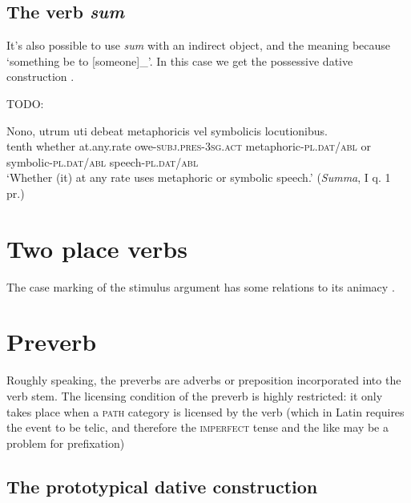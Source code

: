 \documentclass[a4paper, oneside, 12pt]{report}
\newcommand*{\citesec}[1]{\S~{#1}}
\newcommand{\form}[1]{\emph{#1}}
\newcommand*{\category}[1]{\textsc{#1}}
\newcommand{\translate}[1]{`#1'}
\newcommand{\literature}[1]{\textit{#1}}
\begin{document}
\subsection{The verb \form{sum}}\label{sec:sum}

It's also possible to use \form{sum} with an indirect object, 
and the meaning because \translate{something be to [someone]_{}}.
In this case we get the possessive dative construction
\citep[\citesec{373}]{allen1903allen}.

TODO: 

\begin{exe}
    \ex \gll Nono, utrum uti debeat metaphoricis vel symbolicis locutionibus. \\
    tenth whether at.any.rate owe-\category{subj}.\category{pres}-\category{3sg}.\category{act}  
    metaphoric-\category{pl.dat/abl} or symbolic-\category{pl.dat/abl} 
    speech-\category{pl.dat/abl} \\
    \glt \translate{Whether (it) at any rate uses metaphoric or symbolic speech.} (\literature{Summa}, I q. 1 pr.)
\end{exe}

\section{Two place verbs}

The case marking of the stimulus argument has some relations to its animacy
\citep[\citesec{4.34}]{Pinkster1}.

\section{Preverb}

Roughly speaking, the preverbs are adverbs or preposition incorporated into the verb stem.
The licensing condition of the preverb is highly restricted:
it only takes place when a \category{path} category is licensed by the verb 
(which in Latin requires the event to be telic, 
and therefore the \category{imperfect} tense and the like may be a problem for prefixation)

\subsection{The prototypical dative construction}\label{sec:vp.complement.indirect-object}
\end{document}

